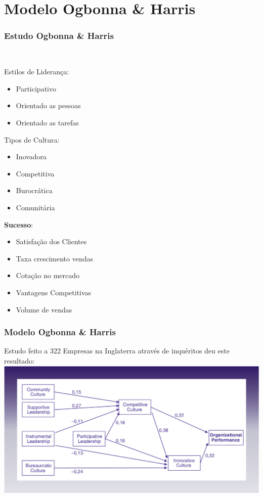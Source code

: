 \section{Modelo Ogbonna \& Harris}
\begin{frame}
\frametitle{Estudo Ogbonna \& Harris}
 \\
\vspace{.7cm}
\begin{minipage}[t]{.3\linewidth}
\quad Estilos de Liderança:
\begin{itemize}
\setlength\itemsep{-0.3em}
\item Participativo
\item Orientado as pessoas
\item Orientado as tarefas
\end{itemize}
\end{minipage}
\begin{minipage}[t]{.3\linewidth}
\quad Tipos de Cultura:
\begin{itemize}
\setlength\itemsep{-0.3em}
\item Inovadora
\item Competitiva
\item Burocrática
\item Comunitária
\end{itemize}
\end{minipage}
\begin{minipage}[t]{.3\linewidth}
\quad \textbf{Sucesso}:
\begin{itemize}
\setlength\itemsep{-0.3em}
\item Satisfação dos Clientes
\item Taxa crescimento vendas
\item Cotação no mercado
\item Vantagens Competitivas
\item Volume de vendas
\end{itemize}
\end{minipage}
\end{frame}
\begin{frame}
\frametitle{Modelo Ogbonna \& Harris}
Estudo feito a 322 Empresas na Inglaterra através de inquéritos deu este resultado:\\
\vspace{.2cm}
\includegraphics[scale=.25]{./image/OB/Ogbonna_Harris.jpg}
\end{frame}
